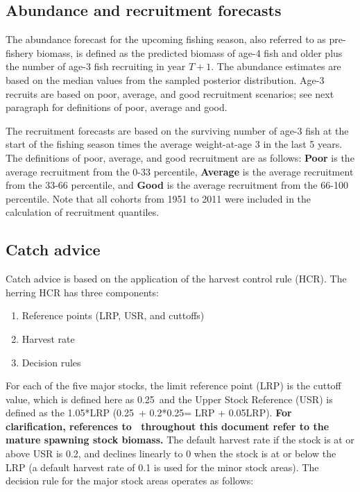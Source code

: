 	\subsection{Abundance and recruitment forecasts}
	The abundance forecast for the upcoming fishing season, also referred to as pre-fishery biomass, is defined as the predicted biomass of age-4 fish and older plus the number of age-3 fish recruiting in year $T+1$.  The abundance estimates are based on the median values from the sampled posterior distribution.  Age-3 recruits are based on poor, average, and good recruitment scenarios; see next paragraph for definitions of poor, average and good.
	
	The recruitment forecasts are based on the surviving number of age-3 fish at the start of the fishing season times the average weight-at-age 3 in the last 5 years. The definitions of poor, average, and good recruitment are as follows: \textbf{Poor} is the average recruitment from the 0-33 percentile, \textbf{Average} is the average recruitment from the 33-66 percentile, and \textbf{Good} is the average recruitment from the 66-100 percentile.  Note that all cohorts from 1951 to 2011  were included in the calculation of recruitment quantiles.
	
	\subsection{Catch advice}
Catch advice is based on the application of the harvest control rule (HCR). The herring HCR has three components:
\begin{enumerate}
\item Reference points (LRP, USR, and cuttoffs)
\item Harvest rate
\item Decision rules
\end{enumerate}

For each of the five major stocks, the limit reference point (LRP) is the cuttoff value, which is defined here as 0.25\bo\, and the	Upper Stock Reference (USR) is defined as the 1.05*LRP (0.25\bo\ + 0.2*0.25\bo = LRP + 0.05LRP). \textbf{For clarification, references to \bo\ throughout this document refer to the mature spawning stock biomass.} The default harvest rate if the stock is at or above USR is 0.2, and declines linearly to 0 when the stock is at or below the LRP (a default harvest rate of 0.1 is used for the minor stock areas).  The decision rule for the major stock areas operates as follows:

